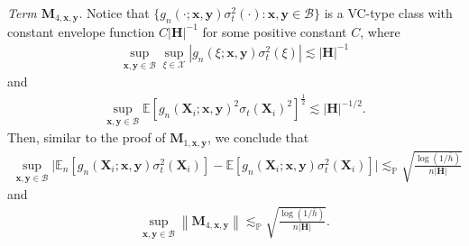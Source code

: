\documentclass[10pt]{article}
\newcommand{\E}{\mathbb{E}}
\newcommand{\En}{\mathbb{E}_n}
\newcommand{\norm}[1]{\left\lVert#1\right\rVert}
\newcommand{\lessp}{\lesssim_{\mathbb{P}}}
\newcommand{\bH}{\mathbf{H}}
\newcommand{\bM}{\mathbf{M}}
\newcommand{\bx}{\mathbf{x}}
\newcommand{\bX}{\mathbf{X}}
\newcommand{\by}{\mathbf{y}}
\newcommand{\B}{\mathcal{B}}
\newcommand{\X}{\mathcal{X}}
\begin{document}
\medskip\textit{Term $\bM_{4,\bx,\by}$}. Notice that $\{g_n(\cdot; \bx, \by)\sigma_t^2(\cdot): \bx, \by \in \B\}$ is a VC-type class with constant envelope function $C |\bH|^{-1}$ for some positive constant $C$, where
\begin{align*}
    \sup_{\bx, \by \in \B} \sup_{\xi \in \X}|g_n(\xi; \bx, \by)\sigma_t^2(\xi)| \lesssim |\bH|^{-1}
\end{align*}
and
\begin{align*}
    \sup_{\bx, \by \in \B} \E[g_n(\bX_i; \bx, \by)^2 \sigma_t(\bX_i)^2]^{\frac{1}{2}} \lesssim |\bH|^{-1/2}.
\end{align*}
Then, similar to the proof of $\bM_{1,\bx,\by}$, we conclude that
\begin{align*}
     \sup_{\bx, \by \in \B} \big|\En[g_n(\bX_i; \bx, \by)\sigma_t^2(\bX_i)] -\E[g_n(\bX_i; \bx, \by)\sigma_t^2(\bX_i)] \big|
     \lessp \sqrt{\frac{\log (1/\bar{h})}{n |\bH|}}
\end{align*}
and
\begin{align*}
     \sup_{\bx, \by \in \B} \norm{\bM_{4,\bx,\by}}
     \lessp \sqrt{\frac{\log (1/\bar{h})}{n |\bH|}}.
\end{align*}
\end{document}
